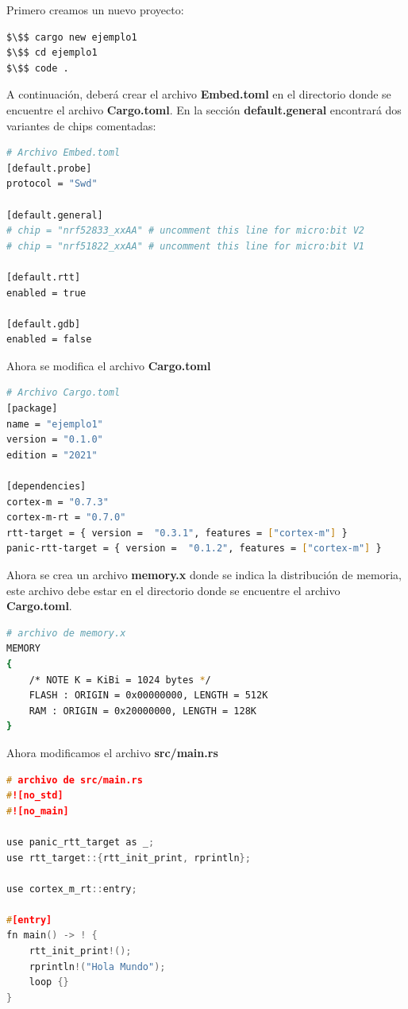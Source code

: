 Primero creamos un nuevo proyecto:

\begin{lstlisting}[language=bash]
$\$$ cargo new ejemplo1
$\$$ cd ejemplo1
$\$$ code .
\end{lstlisting} 


A continuación, deberá crear el archivo \textbf{Embed.toml} en el directorio donde se encuentre el archivo \textbf{Cargo.toml}. En la sección \textbf{default.general} encontrará dos variantes de chips comentadas:

\begin{lstlisting}[language=bash]
# Archivo Embed.toml
[default.probe]
protocol = "Swd"

[default.general]
# chip = "nrf52833_xxAA" # uncomment this line for micro:bit V2
# chip = "nrf51822_xxAA" # uncomment this line for micro:bit V1

[default.rtt]
enabled = true

[default.gdb]
enabled = false
\end{lstlisting}

Ahora se modifica el archivo \textbf{Cargo.toml} 

\begin{lstlisting}[language=bash]
# Archivo Cargo.toml
[package]
name = "ejemplo1"
version = "0.1.0"
edition = "2021"

[dependencies]
cortex-m = "0.7.3"
cortex-m-rt = "0.7.0"
rtt-target = { version =  "0.3.1", features = ["cortex-m"] }
panic-rtt-target = { version =  "0.1.2", features = ["cortex-m"] }
\end{lstlisting}

Ahora se crea un archivo \textbf{memory.x} donde se indica la distribución de memoria, este archivo debe estar en el directorio donde se encuentre el archivo \textbf{Cargo.toml}.

\begin{lstlisting}[language=bash]
# archivo de memory.x
MEMORY
{
	/* NOTE K = KiBi = 1024 bytes */
	FLASH : ORIGIN = 0x00000000, LENGTH = 512K
	RAM : ORIGIN = 0x20000000, LENGTH = 128K
}
\end{lstlisting}

Ahora modificamos el archivo \textbf{src/main.rs} 

\begin{lstlisting}[language=c]
# archivo de src/main.rs
#![no_std]
#![no_main]

use panic_rtt_target as _;
use rtt_target::{rtt_init_print, rprintln};

use cortex_m_rt::entry;

#[entry]
fn main() -> ! {
	rtt_init_print!();
	rprintln!("Hola Mundo");
	loop {}
}

\end{lstlisting}

